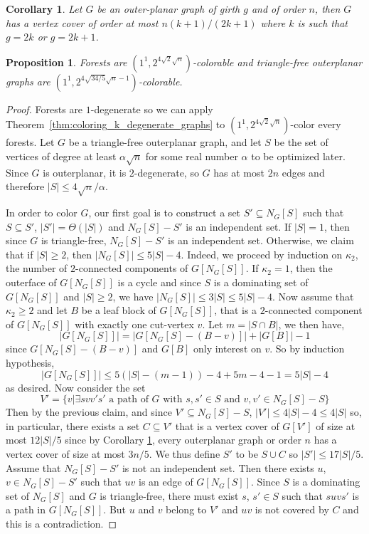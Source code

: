\documentclass[10pt,a4paper]{amsart}
\newtheorem{corollary}{Corollary}
\newtheorem{proposition}{Proposition}
\newcommand{\colo}[2]{(1^{#1}, 2^{#2})}
\begin{document}
\begin{corollary}\label{coro:vertex_cover_coro}
    Let $G$ be an outer-planar graph of girth $g$ and of order $n$, then $G$ has a vertex cover of order at most $n(k + 1)/(2k + 1)$ where $k$ is such that $g = 2k$ or $g = 2k + 1$.
\end{corollary}

\begin{proposition}\label{prop:upperbound_colo_for_forests_and_triangle-free_outerplanar_graphs}
    Forests are $\colo{1}{4\sqrt{2}\sqrt{n}}$-colorable and triangle-free outerplanar graphs are $\colo{1}{4\sqrt{34/5}\sqrt{n} - 1}$-colorable.
\end{proposition}

\begin{proof}
    Forests are $1$-degenerate so we can apply Theorem~\ref{thm:coloring_k_degenerate_graphs} to $\colo{1}{4\sqrt{2}\sqrt{n}}$-color every forests. 
    Let $G$ be a triangle-free outerplanar graph, and let $S$ be the set of vertices of degree at least $\alpha \sqrt{n}$ for some real number $\alpha$ to be optimized later. Since $G$ is outerplanar, it is $2$-degenerate, so $G$ has at most $2n$ edges and therefore $|S| \leq 4\sqrt{n}/\alpha$. 

    In order to color $G$, our first goal is to construct a set $S' \subseteq N_G[S]$ such that $S \subseteq S'$, $|S'| = \Theta(|S|)$ and $N_G[S] - S'$ is an independent set. If $|S| = 1$, then since $G$ is triangle-free, $N_G[S] - S'$ is an independent set. Otherwise, we claim that if $|S| \geq 2$, then $|N_G[S]| \le 5|S|-4$.
    Indeed, we proceed by induction on $\kappa_2$, the number of $2$-connected components of $G[N_G[S]]$. If $\kappa_2 = 1$, then the outerface of $G[N_G[S]]$ is a cycle and since $S$ is a dominating set of $G[N_G[S]]$ and $|S| \ge 2$, we have $|N_G[S]| \le 3|S| \le  5|S| - 4$. Now assume that $\kappa_2 \geq 2$ and let $B$ be a leaf block of $G[N_G[S]]$, that is a $2$-connected component of $G[N_G[S]]$ with exactly one cut-vertex $v$. Let $m = |S \cap B|$, we then have, 
        \[|G[N_G[S]]| = |G[N_G[S] - (B - v)]| + |G[B]| - 1\]
    since $G[N_G[S] - (B - v)]$ and $G[B]$ only interest on $v$. So by induction hypothesis, 
        \[|G[N_G[S]]| \le 5(|S| - (m - 1)) - 4 + 5m - 4 - 1 = 5|S| - 4\]
    as desired. Now consider the set 
    \[V' = \{v | \exists svv's' \textrm{ a path of } G \textrm{ with } s, s' \in S \textrm{ and } v, v' \in N_G[S] - S\}\]
    Then by the previous claim, and since $V' \subseteq N_G[S] - S$, $|V'| \le 4|S| - 4 \le 4|S|$ so, in particular, there exists a set $C \subseteq V'$ that is a vertex cover of $G[V']$ of size at most $12|S|/5$ since by Corollary \ref{coro:vertex_cover_coro}, every outerplanar graph or order $n$ has a vertex cover of size at most $3n/5$. We thus define $S'$ to be $S \cup C$ so $|S'| \le 17|S|/5$. Assume that $N_G[S] - S'$ is not an independent set. Then there exists $u$, $v \in N_G[S] - S'$ such that $uv$ is an edge of $G[N_G[S]]$. Since $S$ is a dominating set of $N_G[S]$ and $G$ is triangle-free, there must exist $s$, $s' \in S$ such that $suvs'$ is a path in $G[N_G[S]]$. But $u$ and $v$ belong to $V'$ and $uv$ is not covered by $C$ and this is a contradiction.


\end{proof}
\end{document}

